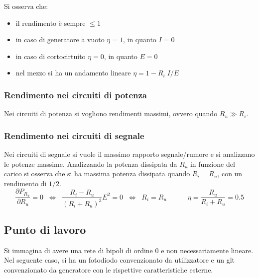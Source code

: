\documentclass[a4paper]{article}
\begin{document}
Si osserva che:
\begin{itemize}
	\item il rendimento è sempre \(\leq 1\)
	\item in caso di generatore a vuoto \(\eta = 1\), in quanto \(I = 0\)
	\item in caso di cortocirtuito \(\eta = 0\), in quanto \(E = 0\)
	\item nel mezzo si ha un andamento lineare \(\eta = 1 - R_i \; I / E\)
\end{itemize}

\subsubsection*{Rendimento nei circuiti di potenza}
Nei circuiti di potenza si vogliono rendimenti massimi, ovvero quando \(R_u \gg R_i\).

\subsubsection*{Rendimento nei circuiti di segnale}
Nei circuiti di segnale si vuole il massimo rapporto segnale/rumore e si analizzano le potenze massime. Analizzando la potenza dissipata
da \(R_u\) in funzione del carico si osserva che si ha massima potenza dissipata quando \(R_i = R_u\), con un rendimento di \(1/2\).
\[\frac{\partial P_{R_u}}{\partial R_u} = 0 \;\; \Leftrightarrow \;\; \frac{R_i - R_u}{(R_i + R_u)^3}E^2 = 0 \;\; \Leftrightarrow \;\; R_i = R_u \qquad\quad \eta = \frac{R_u}{R_i + R_u} = 0.5\]

\subsection{Punto di lavoro}
Si immagina di avere una rete di bipoli di ordine 0 e non necessariamente lineare. Nel seguente caso, si ha un fotodiodo
convenzionato da utilizzatore e un glt convenzionato da generatore con le rispettive caratteristiche esterne.
\end{document}
